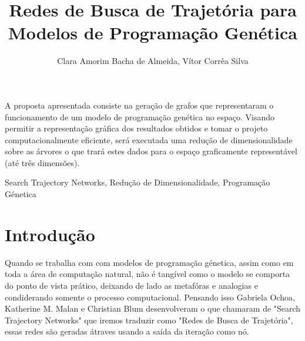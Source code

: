 \documentclass{sbrt}
\begin{document}
\title{Redes de Busca de Trajetória para Modelos de Programação Genética }

\author{Clara Amorim Bacha de Almeida, Vítor Corrêa Silva
}

\maketitle



\begin{resumo}
A proposta apresentada consiste na geração de grafos que representaram o funcionamento de um modelo de programação genética no espaço.
Visando permitir a representação gráfica dos resultados obtidos e tomar o projeto computacionalmente eficiente, será executada uma redução 
de dimensionalidade sobre as árvores o que trará estes dados para o espaço graficamente representável (até três dimensões).
\end{resumo}
\begin{chave}
Search Trajectory Networks, Redução de Dimensionalidade, Programação Génetica
\end{chave}





\section{Introdução}

Quando se trabalha com com modelos de programação génetica, assim como em toda a área de computação natural, 
não é tangível como o modelo se comporta do ponto de vista prático, deixando de lado as metafóras e analogias 
e condiderando somente o processo computacional. Pensando isso Gabriela Ochoa, Katherine M. Malan e Christian 
Blum desenvolveram o que chamaram de "Search Trajectory Networks" que iremos traduzir como "Redes de Busca de 
Trajetória", essas redes são geradas átraves usando a saída da iteração como nó.
\end{document}
